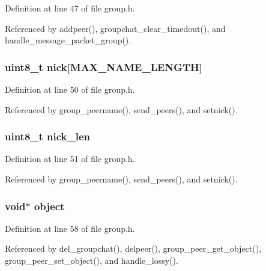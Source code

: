 Definition at line 47 of file group.\+h.



Referenced by addpeer(), groupchat\+\_\+clear\+\_\+timedout(), and handle\+\_\+message\+\_\+packet\+\_\+group().

\hypertarget{struct_group___peer_ae7cf3fd18e321fab5a711e72622301b9}{
\subsubsection[{nick}]{\setlength{\rightskip}{0pt plus 5cm}uint8\+\_\+t nick\mbox{[}{\bf M\+A\+X\+\_\+\+N\+A\+M\+E\+\_\+\+L\+E\+N\+G\+T\+H}\mbox{]}}}\label{struct_group___peer_ae7cf3fd18e321fab5a711e72622301b9}


Definition at line 50 of file group.\+h.



Referenced by group\+\_\+peername(), send\+\_\+peers(), and setnick().

\hypertarget{struct_group___peer_aa316280abcd8913a502b56397dd13e23}{
\subsubsection[{nick\+\_\+len}]{\setlength{\rightskip}{0pt plus 5cm}uint8\+\_\+t nick\+\_\+len}}\label{struct_group___peer_aa316280abcd8913a502b56397dd13e23}


Definition at line 51 of file group.\+h.



Referenced by group\+\_\+peername(), send\+\_\+peers(), and setnick().

\hypertarget{struct_group___peer_a077376d12464f945e2414d5499c79b3f}{
\subsubsection[{object}]{\setlength{\rightskip}{0pt plus 5cm}void$\ast$ object}}\label{struct_group___peer_a077376d12464f945e2414d5499c79b3f}


Definition at line 58 of file group.\+h.



Referenced by del\+\_\+groupchat(), delpeer(), group\+\_\+peer\+\_\+get\+\_\+object(), group\+\_\+peer\+\_\+set\+\_\+object(), and handle\+\_\+lossy().


